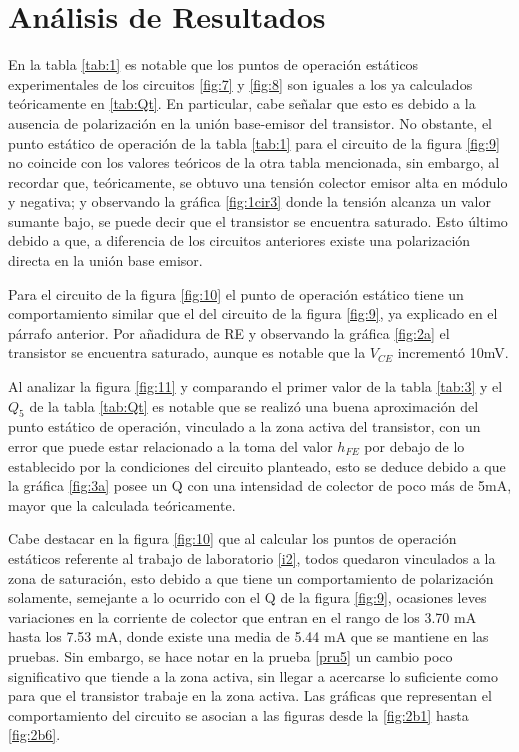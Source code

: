 \documentclass[10pt, a4paper]{article}
\begin{document}
    \newpage

    \section{Análisis de Resultados}

    En la tabla \ref{tab:1} es notable que los puntos de operación estáticos experimentales de los circuitos \ref{fig:7} y \ref{fig:8} son iguales a los ya calculados teóricamente en \ref{tab:Qt}. En particular, cabe señalar que esto es debido a la ausencia de polarización en la unión base-emisor del transistor. No obstante, el punto estático de operación de la tabla \ref{tab:1} para el circuito de la figura \ref{fig:9} no coincide con los valores teóricos de la otra tabla mencionada, sin embargo, al recordar que, teóricamente, se obtuvo una tensión colector emisor alta en módulo y negativa; y observando la gráfica \ref{fig:1cir3} donde la tensión alcanza un valor sumante bajo, se puede decir que el transistor se encuentra saturado. Esto último debido a que, a diferencia de los circuitos anteriores existe una polarización directa en la unión base emisor.

    Para el circuito de la figura \ref{fig:10} el punto de operación estático tiene un comportamiento similar que el del circuito de la figura \ref{fig:9}, ya explicado en el párrafo anterior. Por añadidura de RE y observando la gráfica  \ref{fig:2a} el transistor se encuentra saturado, aunque es notable que la $V_{CE}$ incrementó 10mV.

    Al analizar la figura \ref{fig:11} y comparando el primer valor de la tabla \ref{tab:3} y el $Q_5$ de la tabla \ref{tab:Qt} es notable que se realizó una buena aproximación del punto estático de operación, vinculado a la zona activa del transistor, con un error que puede estar relacionado a la toma del valor $h_{FE}$ por debajo de lo establecido por la condiciones del circuito planteado, esto se deduce debido a que la gráfica \ref{fig:3a} posee un Q con una intensidad de colector de poco más de 5mA, mayor que la calculada teóricamente.

    Cabe destacar en la figura \ref{fig:10} que al calcular los puntos de operación estáticos referente al trabajo de laboratorio \ref{i2}, todos quedaron vinculados a la zona de saturación, esto debido a que tiene un comportamiento de polarización solamente, semejante a lo ocurrido con el Q de la figura \ref{fig:9}, ocasiones leves variaciones en la corriente de colector que entran en el rango de los 3.70 mA hasta los 7.53 mA, donde existe una media de 5.44 mA que se mantiene en las pruebas. Sin embargo, se hace notar en la prueba \ref{pru5} un cambio poco significativo que tiende a la zona activa, sin llegar a acercarse lo suficiente como para que el transistor trabaje en la zona activa. Las gráficas que representan el comportamiento del circuito se asocian a las figuras desde la \ref{fig:2b1} hasta \ref{fig:2b6}.
\end{document}
